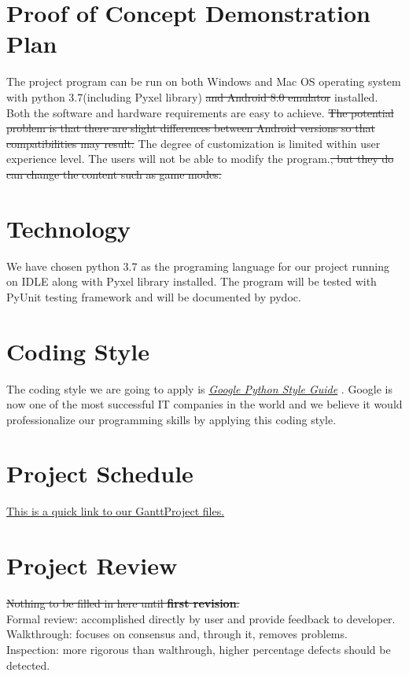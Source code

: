 \documentclass{article}
\begin{document}
\section{Proof of Concept Demonstration Plan}
The project program can be run on both Windows and Mac OS operating system with python 3.7(including Pyxel library) \sout{and Android 8.0 emulator} installed. Both the software and hardware requirements are easy to achieve. \sout{The potential problem is that there are slight differences between Android versions so that compatibilities may result. }The degree of customization is limited within user experience level.  The users will not be able to modify the program.\sout{, but they do can change the content such as game modes.}
\section{Technology}
We have chosen python 3.7 as the programing language for our project running on IDLE along with Pyxel library installed. The program will be tested with PyUnit testing framework and will be documented by pydoc.
\section{Coding Style}
The coding style we are going to apply is \href{https://github.com/google/styleguide/blob/gh-pages/pyguide.md}{\emph{Google Python Style Guide}} \cite{w1}. Google is now one of the most successful IT companies in the world and we believe it would professionalize our programming skills by applying this coding style.\\

\section{Project Schedule}

\href{https://gitlab.cas.mcmaster.ca/3XA3_Cloud10/se3xa3/tree/master/shoot_game/ProjectSchedule}{This is a quick link to our GanttProject files.}

\section{Project Review}
\sout{Nothing to be filled in here until \textbf{first revision}.}\\
{\color{red} Formal review: accomplished directly by user and provide feedback to developer.}\\
{\color{red} Walkthrough: focuses on consensus and, through it, removes problems.}\\
{\color{red} Inspection: more rigorous than walthrough, higher percentage defects should be detected.}




\end{document}
